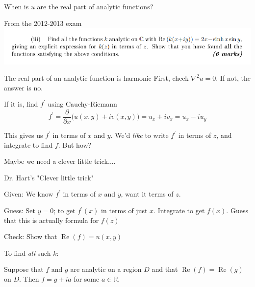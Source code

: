 \documentclass{beamer}
\newcommand{\R}{\mathbb{R}}
\DeclareMathOperator{\Real}{Re}
\begin{document}
\begin{frame}{When is $u$ are the real part of analytic functions?}
\begin{block}{From the 2012-2013 exam}
\includegraphics[width=\textwidth,height=0.8\textheight,keepaspectratio]{RealPart2012.png}
\end{block}

\begin{block}{The real part of an analytic function is harmonic}
First, check $\nabla^2u=0$.  If not, the answer is no.
\end{block}

\begin{block}{If it is, find $f^\prime$ using Cauchy-Riemann}
$$f^\prime=\frac{\partial}{\partial x} \Big(u(x,y)+iv(x,y)\Big)=u_x+iv_x=u_x-iu_y$$
\end{block}

This gives us $f^\prime$ in terms of $x$ and $y$.  We'd \emph{like} to write $f^\prime$ in terms of $z$, and integrate to find $f$. But how?

\begin{block}{Maybe we need a clever little trick....}
\end{block}

\end{frame}

\begin{frame}{Dr. Hart's "Clever little trick"}
\begin{block}{Given:}
We know $f^\prime$ in terms of $x$ and $y$, want it terms of $z$.
\end{block}

\begin{block}{Guess:}
Set $y=0$; to get $f^\prime(x)$ in terms of just $x$.  Integrate to get $f(x)$.  Guess that this is actually formula for $f(z)$
\end{block}

\begin{block}{Check:}
Show that $\Real(f)=u(x,y)$
\end{block}
\begin{block}{To find \emph{all} such $k$:}
\begin{lemma}Suppose that $f$ and $g$ are analytic on a region $D$ and that $\Real(f)=\Real(g)$ on $D$.  Then $f=g+ia$ for some $a\in\R.$
\end{lemma}
\end{block}

\end{frame}
\end{document}
